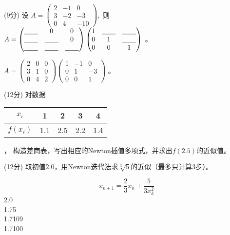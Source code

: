 \documentclass[12pt,letter]{ustcexam}
\def\ds{\displaystyle}
\begin{document}
\begin{problems}
\question (9分) 设 $ \ds{A=\begin {pmatrix} 2 & -1 & 0 \\
3 & -2 & -3 \\ 0 & 4 & -10 \end {pmatrix}}$,\  则 
$ A=\begin{pmatrix} \twob & 0 & 0 \\ \twob & \twob & 0 \\ \twob & \twob &\twob
\end{pmatrix} \begin{pmatrix} 1 & \twob & \twob \\ 0 & 1 & \twob \\ 0 & 0 & 1 
\end{pmatrix} $ 。
\begin{sol}
$ A=\begin{pmatrix} 2 & 0 & 0 \\ 3 & 1 & 0 \\ 0 & 4 & 2\end{pmatrix}
 \begin{pmatrix} 1 & -1 & 0 \\ 0 & 1 & -3 \\ 0 & 0 & 1 
\end{pmatrix} $ 。
\end{sol}

\newpage
{}
\qu (12分) 对数据 
\begin{tabular}{c|cccc} $x_i$  & 1 & 2 & 3 & 4
\\\hline $f(x_i)$ & 1.1 & 2.5 & 2.2 & 1.4
\end{tabular} ，
构造差商表，写出相应的Newton插值多项式，并求出$f(2.5)$的近似值。

\vspace*{0.4\textheight}

\qu (12分) 取初值$2.0$，用Newton迭代法求$\sqrt[3]{5}$的近似（最多只计算3步）。
\begin{sol}
$$
x_{n+1}=\dfrac{2}{3}x_n+\dfrac{5}{3 x_k^2}
$$
2.0 \\
1.75 \\
1.7109 \\
1.7100
\end{sol}


\end{problems}
\end{document}
